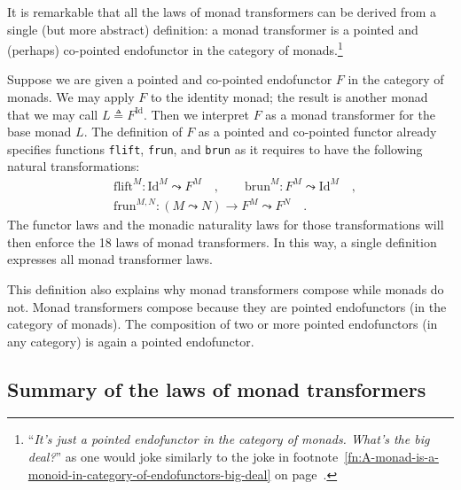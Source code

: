 It is remarkable that all the laws of monad transformers can be derived
from a single (but more abstract) definition: a monad transformer
is  a pointed and (perhaps) co-pointed endofunctor in the category
of monads.\footnote{\textsf{``}\emph{It\textsf{'}s just a pointed endofunctor in the category of monads.
What\textsf{'}s the big deal?}\textsf{''} as one\label{fn:Whats-the-big-deal-monad-transformers}
would joke similarly to the joke in footnote~\ref{fn:A-monad-is-a-monoid-in-category-of-endofunctors-big-deal}
on page~\pageref{fn:A-monad-is-a-monoid-in-category-of-endofunctors-big-deal}. } 

Suppose we are given a pointed and co-pointed endofunctor $F$ in
the category of monads. We may apply $F$ to the identity monad; the
result is another monad that we may call $L\triangleq F^{\text{Id}}$.
Then we interpret $F$ as a monad transformer for the base monad $L$.
The definition of $F$ as a pointed and co-pointed functor already
specifies functions \lstinline!flift!, \lstinline!frun!, and \lstinline!brun!
as it requires to have the following natural transformations:
\begin{align*}
 & \text{flift}^{M}:\text{Id}^{M}\leadsto F^{M}\quad,\quad\quad\text{brun}^{M}:F^{M}\leadsto\text{Id}^{M}\quad,\\
 & \text{frun}^{M,N}:(M\leadsto N)\rightarrow F^{M}\leadsto F^{N}\quad.
\end{align*}
The functor laws and the monadic naturality laws for those transformations
will then enforce the 18 laws of monad transformers. In this way,
a single definition expresses all monad transformer laws.

This definition also explains why monad transformers compose while
monads do not. Monad transformers compose because they are pointed
endofunctors (in the category of monads). The composition of two or
more pointed endofunctors (in any category) is again a pointed endofunctor.

\subsection{Summary of the laws of monad transformers\label{subsec:Laws-of-monad-transformers}}

